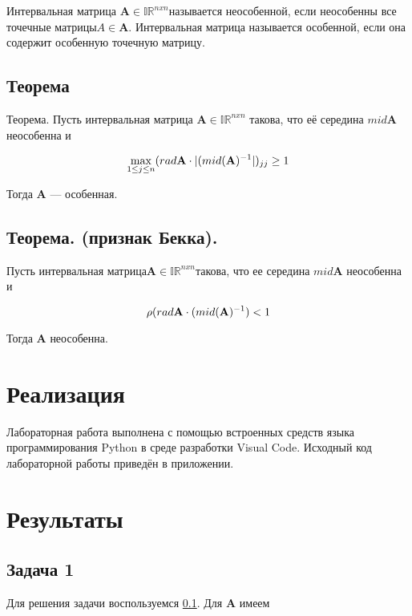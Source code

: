 \documentclass[12pt,a4paper]{scrartcl}
\begin{document}
Интервальная матрица $\textbf{A} \in \mathds{I} \mathds{R}^{nxn} $называется неособенной, если
неособенны все точечные матрицы$ A \in \textbf{A}$. Интервальная матрица называется особенной, если она содержит
особенную точечную матрицу.

\subsection {Теорема}\label{Theorem}

Теорема. Пусть интервальная матрица $\textbf{A} \in \mathds{I} \mathds{R}^{nxn}$ такова, что её
середина $mid \textbf{A}$ неособенна и 

\begin{equation}
\centering
\max_{1\leq j \leq n}(rad  \textbf{A} \cdot |(mid( \textbf{A})^{-1}|)_{jj} \geq 1
\end{equation}

Тогда \textbf{A} — особенная.

\subsection {Теорема. (признак Бекка).}\label{Bek}

Пусть интервальная матрица$ \textbf{A} \in \mathds{I} \mathds{R}^{nxn} $такова, что ее середина $mid \textbf{A}$ неособенна и 

\begin{equation}
\centering
\rho (rad  \textbf{A} \cdot (mid( \textbf{A})^{-1}) < 1
\end{equation}

Тогда \textbf{A} неособенна.

\section {Реализация}
Лабораторная работа выполнена с помощью встроенных средств языка программирования Python в среде разработки Visual Code. Исходный код лабораторной
работы приведён в приложении.
 
\section{Результаты}

\subsection{Задача 1}

Для решения задачи воспользуемся \ref{Theorem}. Для $\textbf{A}$ имеем
\end{document}
